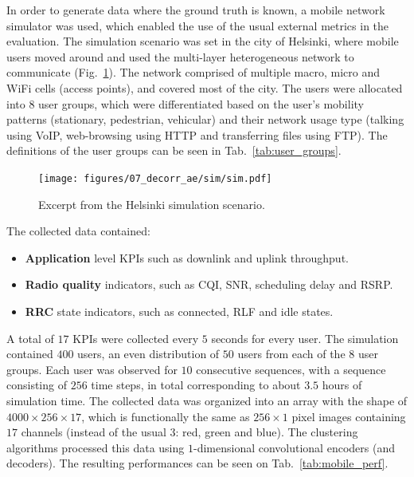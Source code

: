 			In order to generate data where the ground truth is known, a mobile network simulator was used, which enabled the use of the usual external metrics in the evaluation.
			The simulation scenario was set in the city of Helsinki, where mobile users moved around and used the multi-layer heterogeneous network to communicate (Fig.~\ref{fig:sim_scenario}).
			The network comprised of multiple macro, micro and WiFi cells (access points), and covered most of the city.
			The users were allocated into $8$ user groups, which were differentiated based on the user's mobility patterns (stationary, pedestrian, vehicular) and their network usage type (talking using \ac{VoIP}, web-browsing using \ac{HTTP} and transferring files using \ac{FTP}).
			The definitions of the user groups can be seen in Tab.~\ref{tab:user_groups}.
			
			\begin{figure}[!ht]
				\centering
				\texttt{[image: figures/07\_decorr\_ae/sim/sim.pdf]}
				\caption[Excerpt from the Helsinki simulation scenario in the DANCE evaluation]{Excerpt from the Helsinki simulation scenario.}
				\label{fig:sim_scenario}
			\end{figure}				
			
			The collected data contained:
			\begin{itemize}
				\item \textbf{Application} level \acp{KPI} such as downlink and uplink throughput.
				\item \textbf{Radio quality} indicators, such as \ac{CQI}, \ac{SNR}, scheduling delay and \ac{RSRP}.
				\item \textbf{\ac{RRC}} state indicators, such as connected, \ac{RLF} and idle states.
			\end{itemize}
			\noindent A total of $17$ \acp{KPI} were collected every $5$ seconds for every user.
			The simulation contained $400$ users, an even distribution of $50$ users from each of the $8$ user groups.
			Each user was observed for $10$ consecutive sequences, with a sequence consisting of $256$ time steps, in total corresponding to about $3.5$ hours of simulation time.
			The collected data was organized into an array with the shape of $4000 \times 256 \times 17$, which is functionally the same as $256 \times 1$ pixel images containing $17$ channels (instead of the usual $3$: red, green and blue).
			The clustering algorithms processed this data using $1$-dimensional convolutional encoders (and decoders).
			The resulting performances can be seen on Tab.~\ref{tab:mobile_perf}.
			
